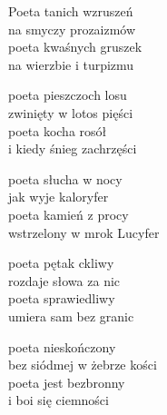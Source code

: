 \begin{text}
    Poeta tanich wzruszeń\\
    na smyczy prozaizmów\\
    poeta kwaśnych gruszek\\
    na wierzbie i turpizmu

    poeta pieszczoch losu\\
    zwinięty w lotos pięści\\
    poeta kocha rosół\\
    i kiedy śnieg zachrzęści

    poeta słucha w nocy\\
    jak wyje kaloryfer\\
    poeta kamień z procy\\
    wstrzelony w mrok Lucyfer

    poeta pętak ckliwy\\
    rozdaje słowa za nic\\
    poeta sprawiedliwy\\
    umiera sam bez granic

    poeta nieskończony\\
    bez siódmej w żebrze kości\\
    poeta jest bezbronny\\
    i boi się ciemności
\end{text}
\begin{chord}

\end{chord}
